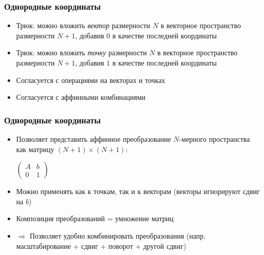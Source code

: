\documentclass[10pt]{beamer}
\begin{document}
\begin{frame}[fragile]
\frametitle{Однородные координаты}
\begin{itemize}
\item Трюк: можно вложить \textit{вектор} размерности \begin{math}N\end{math} в векторное пространство размерности \begin{math}N+1\end{math}, добавив \begin{math}0\end{math} в качестве последней координаты
\pause
\item Трюк: можно вложить \textit{точку} размерности \begin{math}N\end{math} в векторное пространство размерности \begin{math}N+1\end{math}, добавив \begin{math}1\end{math} в качестве последней координаты
\pause
\item Согласуется с операциями на векторах и точках
\pause
\item Согласуется с аффинными комбинациями
\end{itemize}
\end{frame}

\begin{frame}[fragile]
\frametitle{Однородные координаты}
\begin{itemize}
\item Позволяет представить аффинное преобразование \begin{math}N\end{math}-мерного пространства как матрицу \begin{math}(N+1)\times (N+1)\end{math}:

\begin{center}
\begin{math}
\begin{pmatrix}
A & b \\
0 & 1
\end{pmatrix}
\end{math}
\end{center}
\pause
\item Можно применять как к точкам, так и к векторам (векторы игнорируют сдвиг на \begin{math}b\end{math})
\pause
\item Композиция преобразований = умножение матриц
\pause
\item \begin{math}\Rightarrow\end{math} Позволяет удобно комбинировать преобразования (напр. масштабирование + сдвиг + поворот + другой сдвиг)
\end{itemize}
\end{frame}
\end{document}
